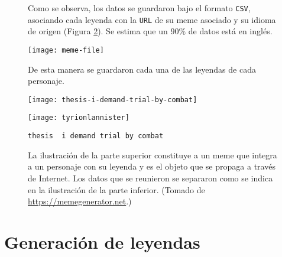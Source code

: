 \begin{figure}[h]
  \centering
  \begin{minipage}[l]{\linewidth}
  \end{minipage}
  \caption{
    Como se observa, los datos se guardaron bajo el formato \texttt{CSV}, asociando cada leyenda con la \texttt{URL}
    de su meme asociado y su idioma de origen (Figura \ref{meme-file}). Se estima que un $90\%$ de datos está en inglés.
  }
  \label{file-hierarchy}
\end{figure}

\begin{figure}[H]
  \centering
  \texttt{[image: meme-file]}
  \caption{
    De esta manera se guardaron cada una de las leyendas de cada personaje.
  }
  \label{meme-file}
\end{figure}

\begin{figure}
  \centering
  \begin{minipage}[l]{\linewidth}
    \texttt{[image: thesis-i-demand-trial-by-combat]}
  \end{minipage}\hfill
  \begin{minipage}[r]{0.5\linewidth}
    \texttt{[image: tyrionlannister]}
  \end{minipage}\hfill
  \begin{minipage}[r]{0.5\linewidth}
    \verb+thesis  i demand trial by combat+
  \end{minipage}
  \caption{
    La ilustración de la parte superior constituye a un meme que integra a un personaje con su leyenda y
    es el objeto que se propaga a través de Internet. Los datos que se reunieron se separaron como se
    indica en la ilustración de la parte inferior.
    (Tomado de \url{https://memegenerator.net}.)
  }
  \label{meme-separation}
\end{figure}

\section{Generación de leyendas}

